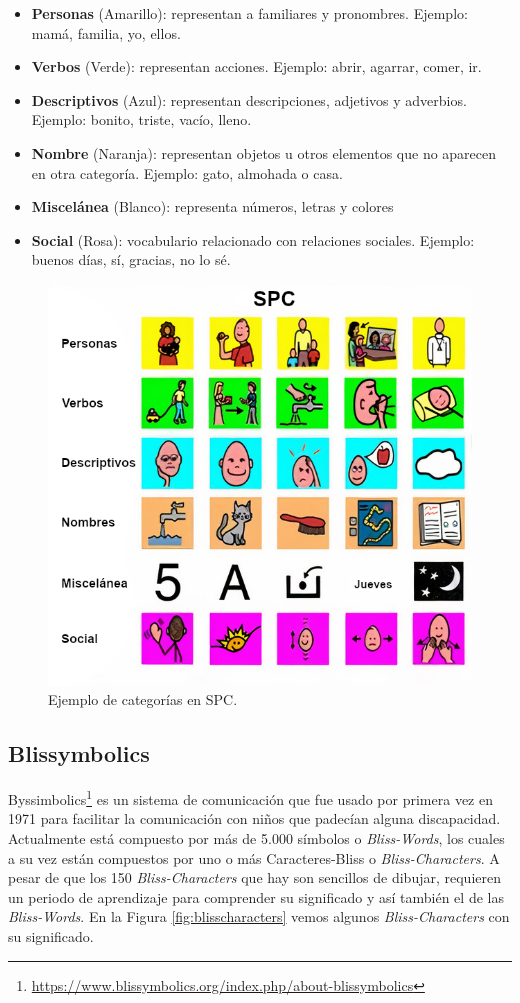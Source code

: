 \begin{itemize}
	\item \textbf{Personas} (Amarillo): representan a familiares y pronombres. Ejemplo: mamá, familia,  yo, ellos.
	\item \textbf{Verbos} (Verde): representan acciones. Ejemplo: abrir, agarrar, comer, ir.
	\item \textbf{Descriptivos} (Azul): representan descripciones, adjetivos y adverbios. Ejemplo: bonito, triste, vacío, lleno.
	\item \textbf{Nombre} (Naranja): representan objetos u otros elementos que no aparecen en otra categoría. Ejemplo: gato, almohada o casa.
	\item \textbf{Miscelánea} (Blanco): representa números, letras y colores
	\item \textbf{Social} (Rosa): vocabulario relacionado con relaciones sociales. Ejemplo: buenos días, sí, gracias, no lo sé.
	
\end{itemize}

\begin{figure}[h!]
	\centering
	\includegraphics[width=0.8\linewidth]{Imagenes/Bitmap/SPCcolores}
	\caption{Ejemplo de categorías en SPC.}
	\label{fig:spccolores}
\end{figure}

\subsection{Blissymbolics}
Byssimbolics\footnote{\url{https://www.blissymbolics.org/index.php/about-blissymbolics}}
es un sistema de comunicación que fue usado por primera vez en 1971 para facilitar la comunicación con niños que padecían alguna discapacidad. Actualmente está compuesto por más de 5.000 símbolos o  \textit{Bliss-Words}, los cuales a su vez están compuestos por uno o más Caracteres-Bliss o  \textit{Bliss-Characters}. A pesar de que los 150 \textit{Bliss-Characters} que hay son sencillos de dibujar, requieren un periodo de aprendizaje para comprender su significado y así también el de las \textit{Bliss-Words}. En la Figura \ref{fig:blisscharacters} vemos algunos \textit{Bliss-Characters} con su significado. \\

